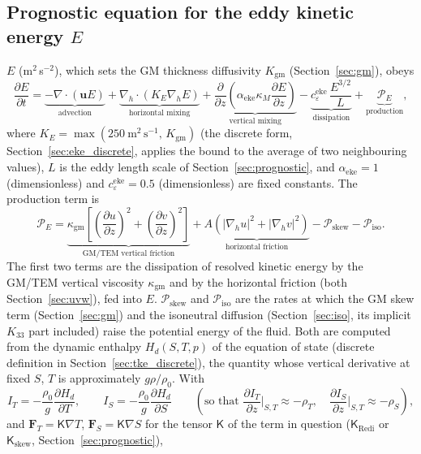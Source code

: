 \documentclass{article}
\begin{document}
\subsection{\texorpdfstring{Prognostic equation for the eddy kinetic energy $E$}{Prognostic equation for the eddy kinetic energy E}}\label{sec:eke}

$E$ (m$^2$\,s$^{-2}$), which sets the GM thickness diffusivity $K_\text{gm}$ (Section~\ref{sec:gm}), obeys
\[
\frac{\partial E}{\partial t} = \underbrace{-\nabla\cdot(\mathbf{u}E)}_{\text{advection}} + \underbrace{\nabla_h\cdot(K_E\nabla_h E)}_{\text{horizontal mixing}} + \underbrace{\frac{\partial}{\partial z}\!\left(\alpha_\text{eke}\kappa_M \frac{\partial E}{\partial z}\right)}_{\text{vertical mixing}} - \underbrace{c_\varepsilon^\text{eke}\, \frac{E^{3/2}}{L}}_{\text{dissipation}} + \underbrace{\mathcal{P}_E}_{\text{production}},
\]
where $K_E = \max(250~\text{m}^2\,\text{s}^{-1},\, K_\text{gm})$ (the discrete form, Section~\ref{sec:eke_discrete}, applies the bound to the average of two neighbouring values), $L$ is the eddy length scale of Section~\ref{sec:prognostic}, and $\alpha_\text{eke}=1$ (dimensionless) and $c_\varepsilon^\text{eke}=0.5$ (dimensionless) are fixed constants.
The production term is
\[
\mathcal{P}_E = \underbrace{\kappa_\text{gm}\!\left[\left(\frac{\partial u}{\partial z}\right)^{2} \!+\! \left(\frac{\partial v}{\partial z}\right)^{2}\right]}_{\text{GM/TEM vertical friction}} + \underbrace{A\!\left(|\nabla_h u|^2 + |\nabla_h v|^2\right)}_{\text{horizontal friction}} - \mathcal{P}_\text{skew} - \mathcal{P}_\text{iso}.
\]
The first two terms are the dissipation of resolved kinetic energy by the GM/TEM vertical viscosity $\kappa_\text{gm}$ and by the horizontal friction (both Section~\ref{sec:uvw}), fed into $E$.
$\mathcal{P}_\text{skew}$ and $\mathcal{P}_\text{iso}$ are the rates at which the GM skew term (Section~\ref{sec:gm}) and the isoneutral diffusion (Section~\ref{sec:iso}, its implicit $K_{33}$ part included) raise the potential energy of the fluid.
Both are computed from the dynamic enthalpy $H_d(S,T,p)$ of the equation of state (discrete definition in Section~\ref{sec:tke_discrete}), the quantity whose vertical derivative at fixed $S$, $T$ is approximately $g\rho/\rho_0$. With
\[
I_T = -\frac{\rho_0}{g}\frac{\partial H_d}{\partial T}, \qquad I_S = -\frac{\rho_0}{g}\frac{\partial H_d}{\partial S}
\qquad\left( \text{so that } \frac{\partial I_T}{\partial z}\bigg|_{S,T} \approx -\rho_T, \quad \frac{\partial I_S}{\partial z}\bigg|_{S,T} \approx -\rho_S \right),
\]
and $\mathbf{F}_T = \mathsf{K}\nabla T$, $\mathbf{F}_S = \mathsf{K}\nabla S$ for the tensor $\mathsf{K}$ of the term in question ($\mathsf{K}_\text{Redi}$ or $\mathsf{K}_\text{skew}$, Section~\ref{sec:prognostic}),
\end{document}
